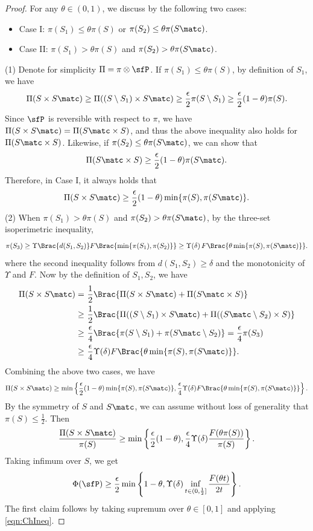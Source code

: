 \documentclass[11pt]{article}
\begin{document}
\begin{proof}
For any $\theta \in (0,1)$, we discuss by the following two cases: 
\begin{itemize}
    \item Case I: $\pi(S_1) \le \theta \pi(S)$ or $\pi(S_2) \le \theta \pi(S\matc)$.
    \item Case II: $ \pi(S_1) > \theta \pi(S)$ and $ \pi(S_2) > \theta \pi(S\matc)$.
\end{itemize}
(1) Denote for simplicity $\Pi = \pi \otimes \sfP$. If $\pi(S_1) \le \theta \pi(S)$, by definition of $S_1$, we have
\[
    \Pi(S \times S\matc) \ge \Pi((S\setminus S_1) \times S\matc) \ge \frac{\epsilon}{2}  \pi(S\setminus S_1) \ge \frac{\epsilon}{2} (1-\theta) \pi(S).
\]
%
Since $\sfP$ is reversible with respect to $\pi$, we have $\Pi(S \times S\matc) = \Pi(S\matc \times S)$, and thus the above inequality also holds for $\Pi(S\matc \times S)$.
Likewise, if $\pi(S_2) \le \theta \pi(S\matc)$, we can show that
\[
    \Pi(S\matc \times S) \ge \frac{\epsilon}{2} (1-\theta) \pi(S\matc).
\]
Therefore, in Case I, it always holds that
\[
    \Pi(S \times S\matc) \ge \frac{\epsilon}{2} (1-\theta) \min \{ \pi(S), \pi(S\matc) \}.
\]
(2) When $ \pi(S_1) > \theta \pi(S)$ and $ \pi(S_2) > \theta \pi(S\matc)$, by the three-set isoperimetric inequality,
\[
    \pi(S_3) \ge \Upsilon \Brac{ d(S_1,S_2) } F \Brac{ \min \{ \pi(S_1), \pi(S_2) \} } \ge \Upsilon(\delta)\, F \Brac{ \theta \min \{ \pi(S), \pi(S\matc) \} }.
\]
where the second inequality follows from $d(S_1,S_2) \ge \delta$ and the monotonicity of $\Upsilon$ and $F$.
Now by the definition of $S_1,S_2$, we have
\begin{align*}
    \Pi(S \times S\matc) =~& \frac{1}{2} \Brac{ \Pi(S \times S\matc) + \Pi(S\matc \times S) } \\
    \ge~& \frac{1}{2} \Brac{ \Pi((S\setminus S_1) \times S\matc) + \Pi((S\matc\setminus S_2) \times S) } \\
    \ge~& \frac{\epsilon}{4} \Brac{ \pi(S\setminus S_1) + \pi(S\matc\setminus S_2)  } = \frac{\epsilon}{4} \pi(S_3) \\
    \ge~& \frac{\epsilon}{4} \Upsilon(\delta) F \Brac{ \theta \min \{ \pi(S), \pi(S\matc) \} }.
\end{align*}
%
Combining the above two cases, we have
\[
    \Pi(S \times S\matc) \ge \min \left\{ \frac{\epsilon}{2} (1-\theta) \min \{ \pi(S), \pi(S\matc) \}, \frac{\epsilon}{4} \Upsilon(\delta) F \Brac{ \theta \min \{ \pi(S), \pi(S\matc) \} } \right\}.
\]
By the symmetry of $S$ and $S\matc$, we can assume without loss of generality that $\pi(S) \le \frac{1}{2}$.
Then
\[
    \frac{\Pi(S \times S\matc)}{\pi(S)} \ge \min \left\{ \frac{\epsilon}{2} (1-\theta), \frac{\epsilon}{4} \Upsilon(\delta) \frac{ F(\theta \pi(S)) }{ \pi(S) } \right\}.
\]
Taking infimum over $S$, we get
\[
    \Phi(\sfP) \ge \frac{\epsilon}{2} \min \left\{ 1-\theta , \Upsilon(\delta) \inf_{t\in(0,\frac{1}{2}]} \frac{ F(\theta t) }{ 2t } \right\}.
\]
The first claim follows by taking supremum over $\theta\in[0,1]$ and applying \eqref{eqn:ChIneq}.


\end{proof}
\end{document}
